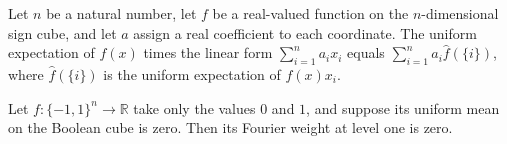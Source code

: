 \begin{theorem}
\label{FABL.expect_mul_levelOneLinearForm_eq}
\leanok
{}
Let $n$ be a natural number, let $f$ be a real-valued function on the $n$-dimensional
sign cube, and let $a$ assign a real coefficient to each coordinate. The uniform
expectation of $f(x)$ times the linear form $\sum_{i=1}^n a_i x_i$ equals $\sum_{i=1}^n
a_i\widehat f(\{i\})$, where $\widehat f(\{i\})$ is the uniform expectation of
$f(x)x_i$.
\end{theorem}

\begin{theorem}
\label{FABL.fourierWeightAtLevel_one_eq_zero_of_zero_one_mean_eq_zero}
\leanok
{}
Let $f:\{-1,1\}^n\to\mathbb{R}$ take only the values $0$ and $1$, and suppose its
uniform mean on the Boolean cube is zero. Then its Fourier weight at level one is zero.
\end{theorem}

